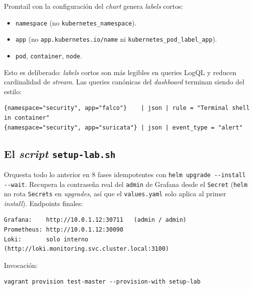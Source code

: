 Promtail con la configuración del \emph{chart} genera \emph{labels} cortos:

\begin{itemize}
  \item \texttt{namespace} (no \texttt{kubernetes\_namespace}).
  \item \texttt{app} (no \texttt{app.kubernetes.io/name} ni \texttt{kubernetes\_pod\_label\_app}).
  \item \texttt{pod}, \texttt{container}, \texttt{node}.
\end{itemize}

Esto es deliberado: \emph{labels} cortos son más legibles en queries LogQL y reducen cardinalidad de \emph{stream}. Las queries canónicas del \emph{dashboard} terminan siendo del estilo:

\begin{lstlisting}[style=bash]
{namespace="security", app="falco"}    | json | rule = "Terminal shell in container"
{namespace="security", app="suricata"} | json | event_type = "alert"
\end{lstlisting}

\subsection{El \emph{script} \texttt{setup-lab.sh}}

Orquesta todo lo anterior en 8 fases idempotentes con \texttt{helm upgrade -{}-install -{}-wait}. Recupera la contraseña real del \texttt{admin} de Grafana desde el \texttt{Secret} (\texttt{helm} no rota \texttt{Secrets} en \emph{upgrades}, así que el \texttt{values.yaml} solo aplica al primer \emph{install}). Endpoints finales:

\begin{lstlisting}[style=bash]
Grafana:    http://10.0.1.12:30711   (admin / admin)
Prometheus: http://10.0.1.12:30090
Loki:       solo interno (http://loki.monitoring.svc.cluster.local:3100)
\end{lstlisting}

Invocación:

\begin{lstlisting}[style=bash]
vagrant provision test-master --provision-with setup-lab
\end{lstlisting}
